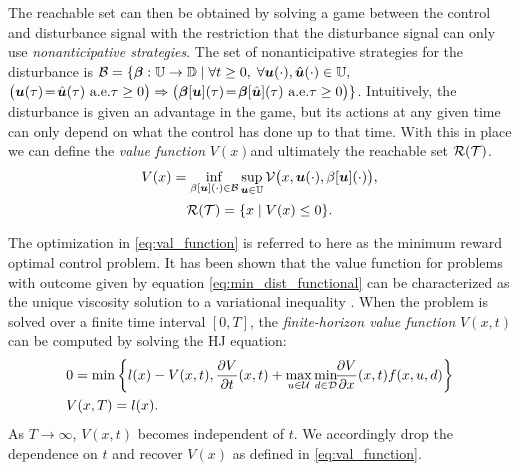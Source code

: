 

The reachable set can then be obtained by solving a game between the control and disturbance signal with the restriction that the disturbance signal can only use \emph{nonanticipative strategies}. The set of nonanticipative strategies for the disturbance is $\mathcal{B} = \{\bm{\beta}:\mathbb{U}\to\mathbb{D}\;|\;
\forall t\ge 0,\; \forall \bm{u}(\cdot),\hat{\bm{u}}(\cdot)\in\mathbb{U},$
${\big(\bm{u}(\tau) \!=\! \hat{\bm{u}}(\tau)\text{ a.e.} \tau\ge0\big)\Rightarrow
{\big(\bm{\beta}[\bm{u}](\tau) \!=\! \bm{\beta}[\hat{\bm{u}}](\tau)}{\text{ a.e.} \tau\ge0\big)}}\}$. Intuitively, the disturbance is given an advantage in the game, but its actions at any given time can only depend on what the control has done up to that time. With this in place we can define the \emph{value function} $V(x)$and ultimately the reachable set $\mathcal{R}(\mathcal{T})$. 
%
\begin{equation} \label{eq:val_function}
V(x)=\inf_{\beta[\bm{u}](\cdot) \in \mathcal{B}} \sup_{\bm{u} \in \mathbb{U}}\mathcal{V}\big(x,\bm{u}(\cdot),\beta[\bm{u}](\cdot)\big),
\end{equation}
%
\begin{equation} \label{eq:reach_set}
\mathcal{R}(\mathcal{T}) = \{x \mid V(x) \le 0\}.
\end{equation}  

The optimization in \eqref{eq:val_function} is referred to here as the minimum reward optimal control problem. It has been shown that the value function for problems with outcome given by equation \eqref{eq:min_dist_functional} can be characterized as the unique viscosity solution to a variational inequality \cite{Barron1990}. When the problem is solved over a finite time interval $[0,T]$, the \emph{finite-horizon value function} $V(x,t)$ can be computed by solving the HJ equation: 
%
\begin{equation} \label{eq:HJ_mr}
\begin{split} 
    & 0 = \min\left\{l(x)-V(x,t), \frac{\partial V}{\partial t}(x,t)+ \max_{u\in\mathcal{U}} \min_{ d\in\mathcal{D}} \!\!\frac{\partial V}{\partial x}(x,t) f(x,u, d)\right\}\\
    &V(x,T) = l(x).
\end{split}
\end{equation}
%
 As $T \rightarrow \infty$, $V(x,t)$ becomes independent of $t$. We accordingly drop the dependence on $t$ and recover $V(x)$ as defined in \eqref{eq:val_function}. 


